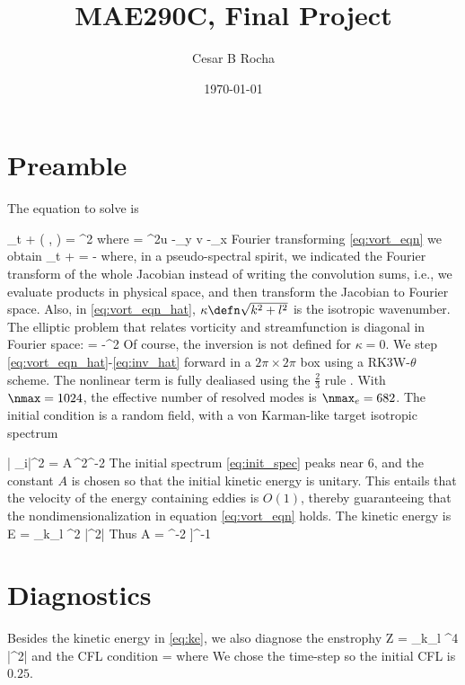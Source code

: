 \documentclass[11pt]{article}
\title{MAE290C, Final Project}
\author{Cesar B Rocha}
\date{\today}
\def\hatgap{2pt}
\def\subdown{-2pt}
\newcommand\what[2][]{%
\renewcommand\stackalignment{l}%
\stackon[\hatgap]{#2}{%
\stretchto{%
    \scalerel*[\widthof{$#2$}]{\kern-.6pt\bigwedge\kern-.6pt}%
    {\rule[-\textheight/2]{1ex}{\textheight}}%
}{0.5ex}%
_{\smash{\belowbaseline[\subdown]{\scriptstyle#1}}}%
}}
\begin{document}

\maketitle

\section*{Preamble}
The equation to solve is

\beq
\label{eq:vort_eqn}
\p_t \zeta + \sJ\left( \psi, \zeta \right ) =  \nabla^2 \zeta\com
\eeq
where
\beq
\label{eq:defns}
\zeta = \nabla^2\psi \com\qquad u  -\p_y \psi\com\qqand v  -\p_x \psi\per
\eeq
Fourier transforming \eqref{eq:vort_eqn} we obtain
\beq
\label{eq:vort_eqn_hat}
\p_t \what{\zeta} + \what{\sJ\left( \psi, \zeta \right )} = - \what{\zeta}\com
\eeq
where, in a pseudo-spectral spirit, we indicated the Fourier transform of the whole Jacobian instead
 of  writing the convolution sums, i.e., we evaluate products in physical space, and then transform
 the Jacobian to Fourier space. Also, in \eqref{eq:vort_eqn_hat}, $\kappa\defn \sqrt{k^2 + l^2}$ is 
 the isotropic wavenumber. The elliptic problem that relates vorticity and streamfunction is diagonal
  in Fourier space:
\beq
\label{eq:inv_hat}
\what{\zeta} = -\kappa^2 \what{\psi}\per
\eeq
Of course, the inversion is not defined for $\kappa = 0$.  We step \eqref{eq:vort_eqn_hat}-\eqref{eq:inv_hat} forward  in a $2\pi\times 2\pi$ box using a RK3W-$\theta$ scheme. The nonlinear term is fully dealiased using the $\tfrac{2}{3}$ rule \cite{orszag1971}. With $\nmax = 1024$, the effective number of resolved modes is $\nmax_e = 682$.  
The initial condition is a random field, with a von Karman-like target isotropic spectrum \cite{mcwilliams1984}

\beq
\label{eq:init_spec}
|\what{q}_i|^2 = A\,\kappa^2^{-2} \per
\eeq
The initial spectrum \eqref{eq:init_spec} peaks near $6$, and the constant $A$ is chosen so that
 the initial kinetic energy is unitary. This entails that the velocity of the
 energy containing eddies is $O(1)$, thereby guaranteeing that the nondimensionalization in equation
 \eqref{eq:vort_eqn} holds. The kinetic energy is 
 \beq
 \label{eq:ke}
 E =  \sum_{k}\sum_{l} \kappa^2 |\psi^2|\per
 \eeq
Thus
\beq
\label{const}
A = \left[\sum_{k}\sum_{l}\left[1 + \left(\frac{\kappa}{6}\right)^2\right]^{-2} \right]^{-1}\per
\eeq

\section*{Diagnostics}
Besides the kinetic energy in \eqref{eq:ke}, we also diagnose the enstrophy
\beq
    Z = \sum_{k}\sum_{l} \kappa^4 |\psi^2|\com
\eeq
and the CFL condition
\beq
{} = \com
\eeq
where 
\beq
\dx {} \frac{2\pi}{\nmax}\per
\eeq
We chose the time-step so the initial CFL is $0.25$.
\end{document}
